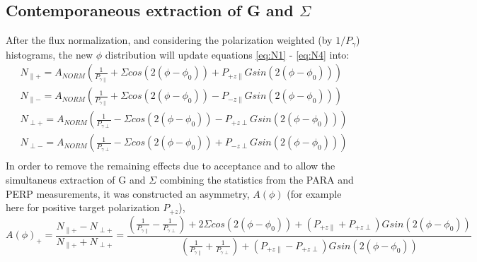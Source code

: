 \subsection{Contemporaneous extraction of G and \texorpdfstring{$\Sigma$}{Sigma}}
After the flux normalization, and considering the polarization weighted (by $1/P_{\gamma}$) histograms, the new $\phi$ distribution will update equations \ref{eq:N1} - \ref{eq:N4} into:
\begin{eqnarray}
N_{\parallel +} = A_{NORM} \left( \frac{1}{P_{\gamma \parallel}} + \Sigma cos(2(\phi-\phi_0)) +  P_{+z\parallel} G sin(2(\phi-\phi_0)) \right) \label{eq:UN1}\\
N_{\parallel -} = A_{NORM} \left(\frac{1}{P_{\gamma \parallel}} + \Sigma cos(2(\phi-\phi_0)) - P_{-z\parallel} G sin(2(\phi-\phi_0)) \right) \label{eq:UN2}\\
N_{\perp +} = A_{NORM} \left( \frac{1}{P_{\gamma \perp}} - \Sigma cos(2(\phi-\phi_0)) -  P_{+z\perp} G sin(2(\phi-\phi_0)) \right) \label{eq:UN3}\\
N_{\perp -} = A_{NORM} \left( \frac{1}{P_{\gamma \perp}} - \Sigma cos(2(\phi-\phi_0)) +  P_{-z\perp} G sin(2(\phi-\phi_0)) \right) \label{eq:UN4}\\
\end{eqnarray}
In order to remove the remaining effects due to acceptance and to allow the simultaneus extraction of G and $\Sigma$ combining the statistics from the PARA and PERP measurements, it was constructed an asymmetry, $A(\phi)$ (for example here for positive target polarization $P_{+z}$),
\begin{equation}
  A(\phi)_+ = \frac{N_{\parallel +} - N_{\perp +}}{N_{\parallel +} + N_{\perp +}} = \frac{ (\frac{1}{P_{\gamma \parallel}} - \frac{1}{P_{\gamma \perp}}) + 2 \Sigma cos(2(\phi-\phi_0)) +  (P_{+z\parallel}+P_{+z\perp}) G sin(2(\phi-\phi_0))}{(\frac{1}{P_{\gamma \parallel}} + \frac{1}{P_{\gamma \perp}}) +(P_{+z\parallel}-P_{+z\perp}) G sin(2(\phi-\phi_0))} \label{eq:A1}
\end{equation}
